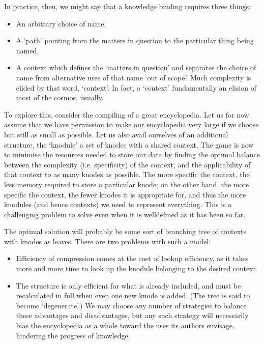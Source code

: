 \documentclass[letterpaper,10pt,english]{jupyterBook}
\begin{document}
\sphinxAtStartPar
In practice, then, we might say that a knowledge binding requires three things:
\begin{itemize}
\item {} 
\sphinxAtStartPar
An arbitrary choice of name,

\item {} 
\sphinxAtStartPar
A ‘path’ pointing from the matters in question to the particular thing being named,

\item {} 
\sphinxAtStartPar
A context which defines the ‘matters in question’ and separates the choice of name from alternative uses of that name ‘out of scope’.
Much complexity is elided by that word, ‘context’. In fact, a ‘context’ fundamentally  an elision \sphinxhyphen{} of most of the cosmos, usually.

\end{itemize}

\sphinxAtStartPar
To explore this, consider the compiling of a great encyclopedia. Let us for now assume that we have permission to make our encyclopedia very large if we choose \sphinxhyphen{} but still as small as possible. Let us also avail ourselves of an additional structure, the ‘knodule’ \sphinxhyphen{} a set of knodes with a shared context. The game is now to minimise the resources needed to store our data by finding the optimal balance between the complexity (i.e. specificity) of the context, and the applicability of that context to as many knodes as possible. The more specific the context, the less memory required to store a particular knode; on the other hand, the more specific the context, the fewer knodes it is appropriate for, and thus the more knodules (and hence contexts) we need to represent everything. This is a challenging problem to solve even when it is well\sphinxhyphen{}defined as it has been so far.

\sphinxAtStartPar
The optimal solution will probably be some sort of branching tree of contexts with knodes as leaves. There are two problems with such a model:
\begin{itemize}
\item {} 
\sphinxAtStartPar
Efficiency of compression comes at the cost of lookup efficiency, as it takes more and more time to look up the knodule belonging to the desired context.

\item {} 
\sphinxAtStartPar
The structure is only efficient for what is already included, and must be recalculated in full when even one new knode is added. (The tree is said to become ‘degenerate’.)
We may choose any number of strategies to balance these advantages and disadvantages, but any such strategy will necessarily bias the encyclopedia as a whole toward the uses its authors envisage, hindering the progress of knowledge.

\end{itemize}
\end{document}
